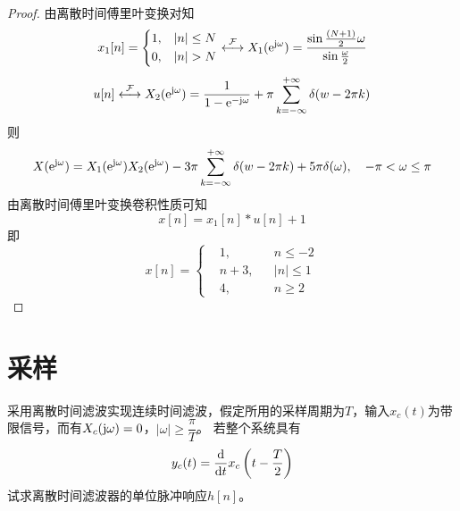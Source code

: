 \begin{proof}
    
    由离散时间傅里叶变换对知
    $$x_1[n] = \left\{
        \begin{aligned}
            & 1, & |n| \leq N \\
            & 0, & |n| > N 
        \end{aligned}
        \right. \stackrel{\mathcal{F}}{\longleftrightarrow} X_1(\mathrm{e}^{\mathrm{j} \omega})  = \dfrac{\sin{\frac{(N + 1)}{2}\omega}}{\sin{\frac{\omega}{2}}}$$ 
    $$u[n] \stackrel{\mathcal{F}}{\longleftrightarrow} X_2(\mathrm{e}^{\mathrm{j} \omega}) = \dfrac{1}{1 - \mathrm{e}^{-\mathrm{j} \omega}} + \pi\sum\limits_{k = -\infty}^{+\infty}{\delta(w - 2\pi k)}$$
    则
    $$X(\mathrm{e}^{\mathrm{j} \omega}) = X_1(\mathrm{e}^{\mathrm{j} \omega}) X_2(\mathrm{e}^{\mathrm{j} \omega}) - 3\pi\sum\limits_{k = -\infty}^{+\infty}{\delta(w - 2\pi k)} + 5\pi\delta(\omega), \quad -\pi < \omega \leq \pi$$
    由离散时间傅里叶变换卷积性质可知
    $$x[n] = x_1[n] \ast u[n] + 1$$
    即
    $$x[n] = \left\{
        \begin{aligned}
            & 1, && n \leq -2 \\
            & n + 3, && |n| \leq 1 \\
            & 4, && n \geq 2 
        \end{aligned}
        \right. 
    $$

\end{proof}

\section{采样}

\begin{proposition}

    采用离散时间滤波实现连续时间滤波，假定所用的采样周期为$T$，输入$x_c(t)$为带限信号，而有$X_c(\mathrm{j} \omega) = 0$，$|\omega| \geq \dfrac{\pi}{T}$。
    若整个系统具有
    $$y_c(t) = \dfrac{\mathrm{d}}{\mathrm{d} t} x_c \left(t - \dfrac{T}{2} \right)$$
    试求离散时间滤波器的单位脉冲响应$h[n]$。

\end{proposition}

